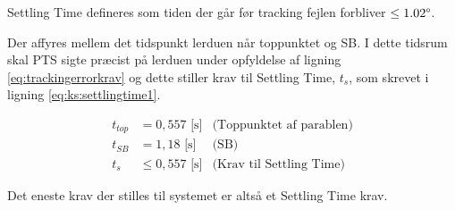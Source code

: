 Settling Time defineres som tiden der går før tracking fejlen forbliver \(\leq 1.02 \degree\).

Der affyres mellem det tidspunkt lerduen når toppunktet og SB.
I dette tidsrum skal PTS sigte præcist på lerduen under opfyldelse af ligning \ref{eq:trackingerrorkrav} og dette 
stiller krav til Settling Time, \(t_s\), som skrevet i ligning \ref{eq:ks:settlingtime1}.

\begin{align}
  t_{top} &= 0,557\text{ [s]} &\text{(Toppunktet af parablen)}
  \label{eq:ks:toppunktstid}
  \\
   t_{SB} &= 1,18\text{ [s]} &\text{(SB)}
  \label{eq:ks:toppunktstid}
  \\
  t_{s} & \leq 0,557\text{ [s]} &\text{(Krav til Settling Time)}
  \label{eq:ks:settlingtime1}
\end{align}

Det eneste krav der stilles til systemet er altså et Settling Time krav.

